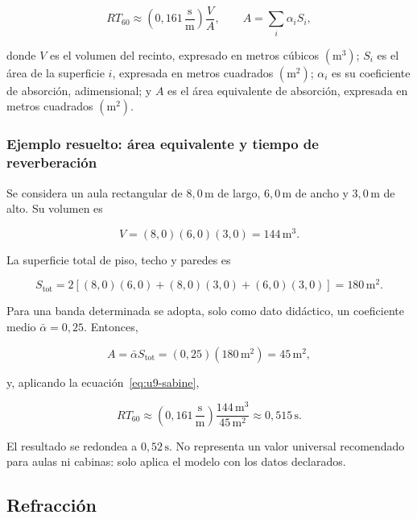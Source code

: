 \begin{equation}
    RT_{60}
      \approx
      \left(0{,}161\,\frac{\text{s}}{\text{m}}\right)\frac{V}{A},
    \qquad
    A=\sum_i \alpha_i S_i,
    \label{eq:u9-sabine}
\end{equation}

donde \(V\) es el volumen del recinto, expresado en metros cúbicos
\((\text{m}^3)\); \(S_i\) es el área de la superficie \(i\), expresada en
metros cuadrados \((\text{m}^2)\); \(\alpha_i\) es su coeficiente de absorción,
adimensional; y \(A\) es el área equivalente de absorción, expresada en metros
cuadrados \((\text{m}^2)\).


\subsubsection*{Ejemplo resuelto: área equivalente y tiempo de reverberación}

Se considera un aula rectangular de \(8{,}0\,\text{m}\) de largo,
\(6{,}0\,\text{m}\) de ancho y \(3{,}0\,\text{m}\) de alto. Su volumen es

\[
    V=(8{,}0)(6{,}0)(3{,}0)=144\,\text{m}^3.
\]

La superficie total de piso, techo y paredes es

\[
    S_\mathrm{tot}
      =2[(8{,}0)(6{,}0)+(8{,}0)(3{,}0)+(6{,}0)(3{,}0)]
      =180\,\text{m}^2.
\]

Para una banda determinada se adopta, solo como dato didáctico, un coeficiente
medio \(\bar{\alpha}=0{,}25\). Entonces,

\[
    A=\bar{\alpha}S_\mathrm{tot}
      =(0{,}25)(180\,\text{m}^2)
      =45\,\text{m}^2,
\]

y, aplicando la ecuación~\eqref{eq:u9-sabine},

\[
    RT_{60}
      \approx
      \left(0{,}161\,\frac{\text{s}}{\text{m}}\right)
      \frac{144\,\text{m}^3}{45\,\text{m}^2}
      \approx0{,}515\,\text{s}.
\]

El resultado se redondea a \(0{,}52\,\text{s}\). No representa un valor
universal recomendado para aulas ni cabinas: solo aplica el modelo con los
datos declarados.

\subsection{Refracción}
\label{sec:u9-refraccion}

